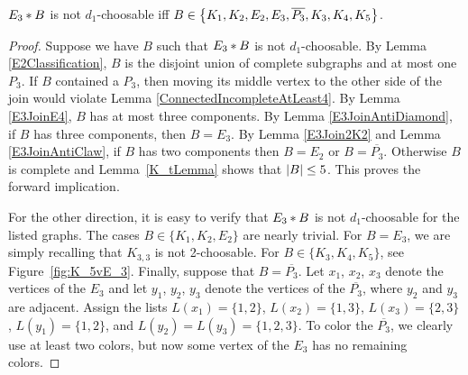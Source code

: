 \begin{lem}\label{E3Classification}
$E_3 \mbox{\hspace{2 pt}$\ast$\hspace{2 pt}} B$ is not $d_1$-choosable iff $B \in \left\{ K_1,K_2,E_2,E_3,\overline{P_3},K_3,K_4,K_5 \right\}$.
\end{lem}
\begin{proof}
Suppose we have $B$ such that $E_3 \mbox{\hspace{2 pt}$\ast$\hspace{2 pt}} B$ is not $d_1$-choosable. By Lemma \ref{E2Classification}, $B$ is the disjoint union of complete subgraphs and at most one $P_3$.  If $B$ contained a $P_3$, then moving its middle vertex to the other side of the join would violate Lemma \ref{ConnectedIncompleteAtLeast4}.  By Lemma \ref{E3JoinE4}, $B$ has at most three components.  By Lemma \ref{E3JoinAntiDiamond}, if $B$ has three components, then $B = E_3$.  By Lemma \ref{E3Join2K2} and Lemma \ref{E3JoinAntiClaw}, if $B$ has two components then $B = E_2$ or $B = \overline{P_3}$.  Otherwise $B$ is complete and Lemma~\ref{K_tLemma}
shows that $\left|B\right| \leq 5$.  This proves the forward implication.

For the other direction, it is easy to verify that $E_3 \mbox{\hspace{2 pt}$\ast$\hspace{2 pt}} B$ is not
$d_1$-choosable for the listed graphs.  The cases $B\in \{K_1,K_2,E_2\}$ are
nearly trivial.  For $B=E_3$, we are simply recalling that $K_{3,3}$ is not
2-choosable.  For $B\in\{K_3,K_4,K_5\}$, see Figure~\ref{fig:K_5vE_3}.  Finally,
suppose that $B=\overline{P_3}$.  Let $x_1$, $x_2$, $x_3$ denote the vertices of
the $E_3$ and let $y_1$, $y_2$, $y_3$ denote the vertices of the
$\overline{P_3}$, where $y_2$ and $y_3$ are adjacent.  Assign the lists
$L(x_1)=\{1,2\}$, $L(x_2)=\{1,3\}$, $L(x_3)=\{2,3\}$, $L(y_1)=\{1,2\}$, and
$L(y_2)=L(y_3)=\{1,2,3\}$.  To color the $\overline{P_3}$, we clearly use at
least two colors, but now some vertex of the $E_3$ has no remaining colors.
\end{proof}

